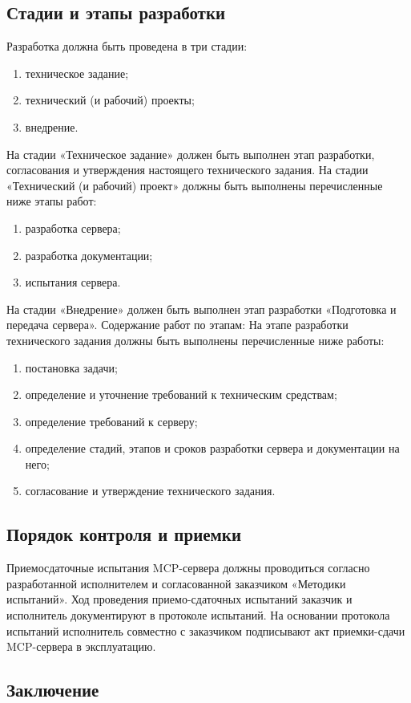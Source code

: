 \documentclass[utf8, russian]{eskdtext}
\begin{document}
\subsection{Стадии и этапы разработки}
Разработка должна быть проведена в три стадии:
\begin{enumerate}
    \item техническое задание;
    \item технический (и рабочий) проекты;
    \item внедрение.
\end{enumerate}
На стадии «Техническое задание» должен быть выполнен этап разработки, согласования и
утверждения настоящего технического задания.
На стадии «Технический (и рабочий) проект» должны быть выполнены перечисленные
ниже этапы работ:
\begin{enumerate}
    \item разработка сервера;
    \item разработка документации;
    \item испытания сервера.
\end{enumerate}
На стадии «Внедрение» должен быть выполнен этап разработки «Подготовка и передача
сервера».
Содержание работ по этапам:
На этапе разработки технического задания должны быть выполнены перечисленные ниже
работы:
\begin{enumerate}
    \item постановка задачи;
    \item определение и уточнение требований к техническим средствам;
    \item определение требований к серверу;
    \item определение стадий, этапов и сроков разработки сервера и документации на него;
    \item согласование и утверждение технического задания.
\end{enumerate}

\subsection{Порядок контроля и приемки}
Приемосдаточные испытания MCP-сервера должны проводиться согласно разработанной
исполнителем и согласованной заказчиком «Методики испытаний».
Ход проведения приемо-сдаточных испытаний заказчик и исполнитель документируют в
протоколе испытаний.
На основании протокола испытаний исполнитель совместно с заказчиком подписывают акт
приемки-сдачи MCP-сервера в эксплуатацию.
\subsection{Заключение}
\end{document}
